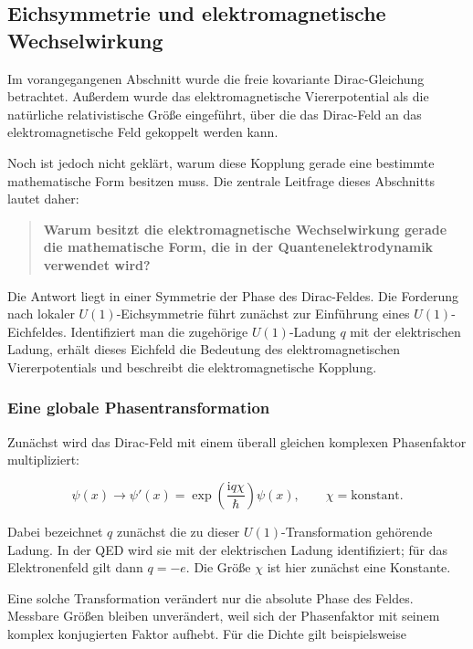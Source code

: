 \subsection{Eichsymmetrie und elektromagnetische Wechselwirkung}
\label{subsec:eichsymmetrie_elektromagnetische_wechselwirkung}

Im vorangegangenen Abschnitt wurde die freie kovariante
Dirac-Gleichung betrachtet. Außerdem wurde das elektromagnetische
Viererpotential als die natürliche relativistische Größe eingeführt,
über die das Dirac-Feld an das elektromagnetische Feld gekoppelt werden
kann.

Noch ist jedoch nicht geklärt, warum diese Kopplung gerade eine
bestimmte mathematische Form besitzen muss. Die zentrale Leitfrage
dieses Abschnitts lautet daher:

\begin{quote}
	\textbf{Warum besitzt die elektromagnetische Wechselwirkung gerade die
	mathematische Form, die in der Quantenelektrodynamik verwendet wird?}
\end{quote}

Die Antwort liegt in einer Symmetrie der Phase des Dirac-Feldes. Die
Forderung nach lokaler \(U(1)\)-Eichsymmetrie führt zunächst zur
Einführung eines \(U(1)\)-Eichfeldes. Identifiziert man die zugehörige
\(U(1)\)-Ladung \(q\) mit der elektrischen Ladung, erhält dieses Eichfeld
die Bedeutung des elektromagnetischen Viererpotentials und beschreibt
die elektromagnetische Kopplung.

\subsubsection*{Eine globale Phasentransformation}

Zunächst wird das Dirac-Feld mit einem überall gleichen komplexen
Phasenfaktor multipliziert:

\begin{equation}
	\psi(x)
	\longrightarrow
	\psi'(x)
	=
	\exp\left(
	\frac{\mathrm{i}q\chi}{\hbar}
	\right)
	\psi(x),
	\qquad
	\chi=\text{konstant}.
	\label{eq:globale_phasentransformation_qed}
\end{equation}

Dabei bezeichnet \(q\) zunächst die zu dieser \(U(1)\)-Transformation
gehörende Ladung. In der QED wird sie mit der elektrischen Ladung
identifiziert; für das Elektronenfeld gilt dann \(q=-e\). Die Größe
\(\chi\) ist hier zunächst eine Konstante.

Eine solche Transformation verändert nur die absolute Phase des
Feldes. Messbare Größen bleiben unverändert, weil sich der Phasenfaktor
mit seinem komplex konjugierten Faktor aufhebt. Für die Dichte gilt
beispielsweise


